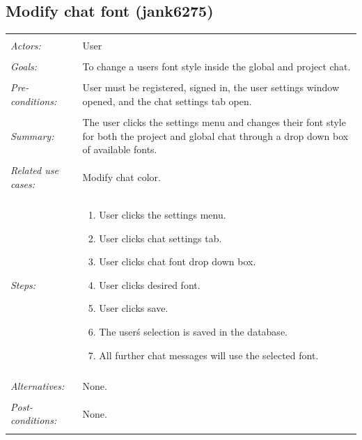 \documentclass[11pt]{report}
\begin{document}
\subsection{Modify chat font (jank6275)}
\begin{tabular}{ p{2cm} p{12cm} }
 \hline
 \\
 \textit{Actors:} & User \\ 
 \\
 \textit{Goals:} & To change a users font style inside the global and project chat. \\
 \\
 \textit{Pre-conditions:} & User must be registered, signed in, the user settings window opened, and the chat settings tab open.  \\
 \\
 \textit{Summary:} & The user clicks the settings menu and changes their font style for both the project and global chat through a drop down box of available fonts. \\ 
 \\
 \textit{Related use cases:} & Modify chat color. \\ 
 \\
 \textit{Steps:} & \begin{enumerate}
  \item User clicks the settings menu.
  \item User clicks chat settings tab.
  \item User clicks chat font drop down box.
  \item User clicks desired font.
  \item User clicks save.
  \item The user\'s selection is saved in the database.
  \item All further chat messages will use the selected font.
 \end{enumerate} \\
 \\
 \textit{Alternatives:} & None. \\
 \\
 \textit{Post-conditions:} & None. \\
 \\
\hline
\end{tabular}
\end{document}
